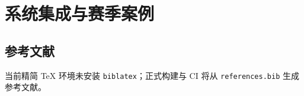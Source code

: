 \documentclass[UTF8,zihao=-4,openany,fontset=fandol]{ctexbook}
\begin{document}
\part{系统集成与赛季案例}






\appendix




\backmatter
\ifusebiblatex
  \printbibliography[heading=bibintoc,title={参考文献}]
\else
  \chapter*{参考文献}
  当前精简 TeX 环境未安装 \texttt{biblatex}；正式构建与 CI 将从
  \texttt{references.bib} 生成参考文献。
\fi
\end{document}
